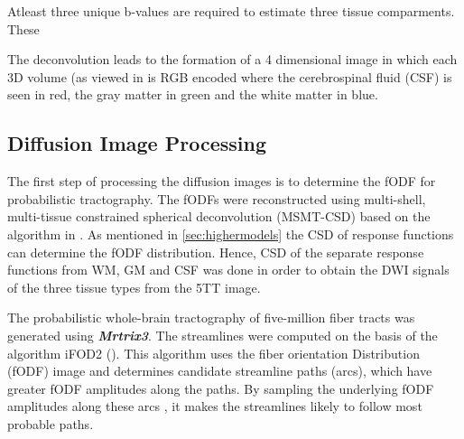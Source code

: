 \documentclass[msthesis.tex]{subfiles}
\begin{document}
Atleast three unique b-values are required to estimate three tissue comparments. These 

The deconvolution leads to the formation of a 4 dimensional image in which each 3D volume (as viewed in  is RGB encoded where the cerebrospinal fluid (CSF) is seen in red, the gray matter in green and the white matter in blue. 
\fi

\subsection{Diffusion Image Processing}

The first step of processing the diffusion images is to determine the fODF for probabilistic tractography. The fODFs were reconstructed using multi-shell, multi-tissue constrained spherical deconvolution (MSMT-CSD) based on the algorithm in \cite{jeurissen2014multi}. As mentioned in  \autoref{sec:highermodels} the CSD of response functions can determine the fODF distribution. Hence, CSD of the separate response functions from WM, GM and CSF was done in order to obtain the DWI signals of the three tissue types from the 5TT image.

The probabilistic whole-brain tractography of five-million fiber tracts was generated using \textbf{\textit{Mrtrix3}}. The streamlines were computed on the basis of the algorithm iFOD2 (\cite{tournier2010improved}). This algorithm uses the fiber orientation Distribution (fODF) image and determines candidate streamline paths (arcs), which have greater fODF amplitudes along the paths. By sampling the underlying fODF amplitudes along these arcs , it makes the streamlines likely to follow most probable paths.
\end{document}
